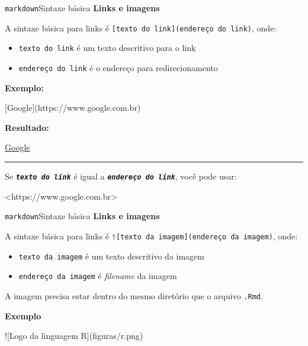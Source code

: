 \documentclass[
  10pt,
  ignorenonframetext,
]{beamer}
\newenvironment{Shaded}{\begin{snugshade}}{\end{snugshade}}
\newcommand{\AlertTok}[1]{\textcolor[rgb]{0.68,0.00,0.00}{#1}}
\newcommand{\CommentTok}[1]{\textcolor[rgb]{0.37,0.37,0.37}{#1}}
\newcommand{\OtherTok}[1]{\textcolor[rgb]{0.00,0.23,0.31}{#1}}
\providecommand{\tightlist}{%
  \setlength{\itemsep}{0pt}\setlength{\parskip}{0pt}}\usepackage{longtable,booktabs,array}
\newcommand*{\destaque}[1]{%
    \colorbox{cabecalho}{\textcolor{titulo}{#1}}
}
\newcommand*{\regrafina}{\rule{\textwidth}{0.5pt}}
\begin{document}
\begin{frame}[fragile]{\texttt{markdown}\newline Sintaxe básica}
\protect\hypertarget{markdownsintaxe-buxe1sica-13}{}
\textbf{Links e imagens}

A sintaxe básica para links é
\texttt{{[}texto\ do\ link{]}(endereço\ do\ link)}, onde:

\begin{itemize}
\tightlist
\item
  \texttt{texto\ do\ link} é um texto descritivo para o link
\item
  \texttt{endereço\ do\ link} é o endereço para redirecionamento
\end{itemize}

\textbf{Exemplo:}

\begin{Shaded}
\begin{Highlighting}[]
\CommentTok{[}\OtherTok{Google}\CommentTok{](https://www.google.com.br)}
\end{Highlighting}
\end{Shaded}

\textbf{Resultado:}

\href{https://www.google.com.br}{Google}

\regrafina

Se \textbf{\emph{\texttt{texto\ do\ link}}} é igual a
\textbf{\emph{\texttt{endereço\ do\ link}}}, você pode usar:

\begin{Shaded}
\begin{Highlighting}[]
\OtherTok{\textless{}https://www.google.com.br\textgreater{}}
\end{Highlighting}
\end{Shaded}
\end{frame}

\begin{frame}[fragile]{\texttt{markdown}\newline Sintaxe básica}
\protect\hypertarget{markdownsintaxe-buxe1sica-14}{}
\textbf{Links e imagens}

A sintaxe básica para links é
\texttt{!{[}texto\ da\ imagem{]}(endereço\ da\ imagem)}, onde:

\begin{itemize}
\tightlist
\item
  \texttt{texto\ da\ imagem} é um texto descritivo da imagem
\item
  \texttt{endereço\ da\ imagem} é \emph{filename} da imagem
\end{itemize}

\destaque{A imagem precisa estar dentro do mesmo diretório que o arquivo \texttt{.Rmd}.}

\textbf{Exemplo}

\begin{Shaded}
\begin{Highlighting}[]
\AlertTok{![Logo da linguagem R](figuras/r.png)}
\end{Highlighting}
\end{Shaded}
\end{frame}
\end{document}

